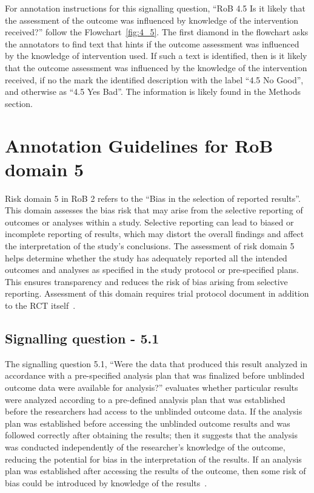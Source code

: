 \documentclass[sn-mathphys,Numbered]{sn-jnl}%
\begin{document}
For annotation instructions for this signalling question, ``RoB 4.5 Is it likely that the assessment of the outcome was influenced by knowledge of the intervention received?'' follow the Flowchart~\ref{fig:4_5}.
The first diamond in the flowchart asks the annotators to find text that hints if the outcome assessment was influenced by the knowledge of intervention used.
If such a text is identified, then is it likely that the outcome assessment was influenced by the knowledge of the intervention received, if no the mark the identified description with the label ``4.5 No Good'', and otherwise as ``4.5 Yes Bad''.
The information is likely found in the Methods section.

%
%
%
\section*{Annotation Guidelines for RoB domain 5}
\label{sec:dom5}
%
Risk domain 5 in RoB 2 refers to the ``Bias in the selection of reported results''.
This domain assesses the bias risk that may arise from the selective reporting of outcomes or analyses within a study.
Selective reporting can lead to biased or incomplete reporting of results, which may distort the overall findings and affect the interpretation of the study's conclusions.
The assessment of risk domain 5 helps determine whether the study has adequately reported all the intended outcomes and analyses as specified in the study protocol or pre-specified plans.
This ensures transparency and reduces the risk of bias arising from selective reporting.
Assessment of this domain requires trial protocol document in addition to the RCT itself~\cite{dwan2013systematic}.
%
%
%
\subsection*{Signalling question - 5.1 }
\label{subsec:5_1}
%
The signalling question 5.1, ``Were the data that produced this result analyzed in accordance with a pre-specified analysis plan that was finalized before unblinded outcome data were available for analysis?'' evaluates whether particular results were analyzed according to a pre-defined analysis plan that was established before the researchers had access to the unblinded outcome data.
If the analysis plan was established before accessing the unblinded outcome results and was followed correctly after obtaining the results; then it suggests that the analysis was conducted independently of the researcher's knowledge of the outcome, reducing the potential for bias in the interpretation of the results.
If an analysis plan was established after accessing the results of the outcome, then some risk of bias could be introduced by knowledge of the results~\cite{riiser2022cycling}.
\end{document}
